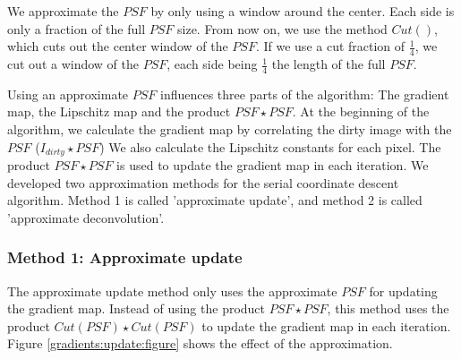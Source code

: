 We approximate the $PSF$ by only using a window around the center. Each side is only a fraction of the full $PSF$ size. From now on, we use the method $Cut()$, which cuts out the center window of the $PSF$. If we use a cut fraction of $\frac{1}{4}$, we cut out a window of the $PSF$, each side being  $\frac{1}{4}$ the length of the full $PSF$.

Using an approximate $PSF$ influences three parts of the algorithm: The gradient map, the Lipschitz map and the product $PSF \star PSF$. At the beginning of the algorithm, we calculate the gradient map by correlating the dirty image with the $PSF$ ($I_{dirty} \star PSF$) We also calculate the Lipschitz constants for each pixel. The product $PSF \star PSF$ is used to update the gradient map in each iteration. We developed two approximation methods for the serial coordinate descent algorithm. Method 1 is called 'approximate update', and method 2 is called 'approximate deconvolution'. 

\subsubsection{Method 1: Approximate update} \label{gradients:methods:update}
The approximate update method only uses the approximate $PSF$ for updating the gradient map. Instead of using the product $PSF \star PSF$, this method uses the product $Cut(PSF) \star Cut(PSF)$ to update the gradient map in each iteration. Figure \ref{gradients:update:figure} shows the effect of the approximation.  

